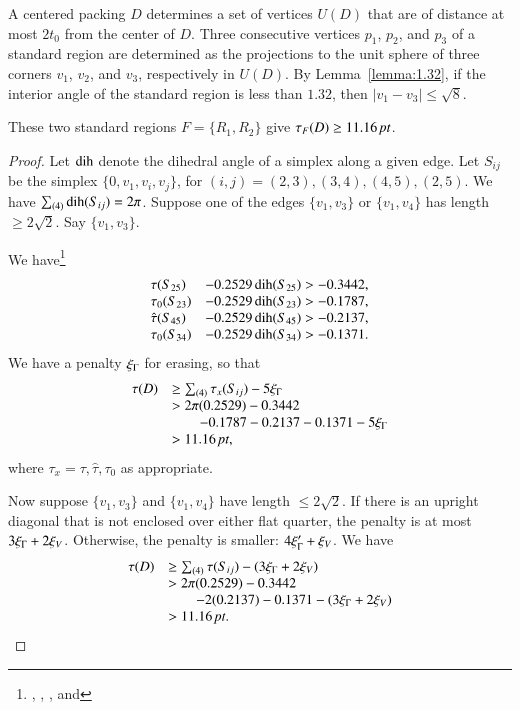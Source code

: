 A centered packing $D$ determines a set of vertices $U(D)$ that
are of distance at most $2t_0$ from the center of $D$.  Three
consecutive vertices $p_1$, $p_2$, and $p_3$ of a standard region
are determined as the projections to the unit sphere of three
corners $v_1$, $v_2$, and $v_3$, respectively in $U(D)$. By
Lemma~\ref{lemma:1.32}, if the interior angle of the standard
region is less than $1.32$, then $|v_1-v_3|\le\sqrt{8}$.

\begin{lemma} \label{lemma:11.16}
These two standard regions $F=\{R_1,R_2\}$ give
    $\tau_F(D) \ge 11.16\,\hbox{\it pt}$.
\end{lemma}

\begin{proof}
Let $\operatorname{dih}$ denote the dihedral angle of a simplex along a given
edge. Let $S_{ij}$ be the simplex $\{0,v_1,v_i,v_j\}$, for
$(i,j)=(2,3),(3,4), (4,5),(2,5)$. We have $\sum_{(4)}\operatorname{dih}(S_{ij})
= 2\pi$. Suppose one of the edges $\{v_1,v_3\}$ or $\{v_1,v_4\}$ has
length $\ge2\sqrt2$. Say $\{v_1,v_3\}$.

We have\footnote{, ,
, and }
    $$
    \begin{array}{lll}
    \tau(S_{25}) &- 0.2529\operatorname{dih}(S_{25}) > -0.3442,\\
    \tau_0(S_{23}) &- 0.2529\operatorname{dih}(S_{23}) > -0.1787,\\
    \hat\tau(S_{45}) &- 0.2529\operatorname{dih}(S_{45}) > -0.2137,\\
    \tau_0(S_{34}) &- 0.2529\operatorname{dih}(S_{34}) > -0.1371.\\
    \end{array}
    $$
We have a penalty $\xi_\Gamma$ for erasing, so that
    $$
    \begin{array}{lll}
        \tau(D) &\ge \sum_{(4)}\tau_x(S_{ij}) - 5\xi_\Gamma\\
                &>2\pi(0.2529)-0.3442\\
                &\qquad -0.1787-0.2137-0.1371-5\xi_\Gamma\\
                &>11.16\,\hbox{\it pt},
    \end{array}
    $$
where $\tau_x=\tau,\hat\tau,\tau_0$ as appropriate.

Now suppose $\{v_1,v_3\}$ and $\{v_1,v_4\}$ have length $\le2\sqrt2$.
If there is an upright diagonal that is not enclosed over either
flat quarter, the penalty is at most $3\xi_\Gamma+2\xi_V$. Otherwise, the
penalty is smaller: $4\xi_\Gamma'+\xi_V$. We have
    $$
    \begin{array}{lll}
    \tau(D)
    &\ge \sum_{(4)}\tau(S_{ij})-(3\xi_\Gamma+2\xi_V)\\
    &>2\pi(0.2529)-0.3442\\
    &\qquad -2(0.2137)-0.1371 -(3\xi_\Gamma+2\xi_V)\\
    &>11.16\,\hbox{\it pt}.\\
    \end{array}
    $$
\end{proof}



